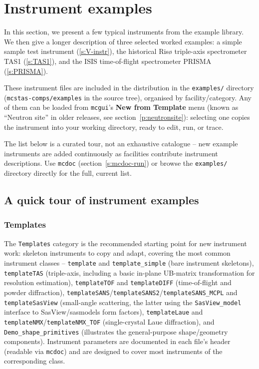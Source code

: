 
\chapter{Instrument examples}
\label{s:instrument}

In this section, we present a few typical instruments from the \MCS example
library.  We then give a longer description of three selected worked
examples: a simple sample test instrument (\ref{s:V-instr}), the historical
Risø triple-axis spectrometer TAS1 (\ref{s:TAS1}), and the ISIS
time-of-flight spectrometer PRISMA (\ref{s:PRISMA}).

These instrument files are included in the \MCS distribution in the
\verb+examples/+ directory (\verb+mcstas-comps/examples+ in the source
tree), organised by facility/category. Any of them can be loaded from
\texttt{mcgui}'s \textbf{New from Template} menu (known as ``Neutron site''
in older \MCS releases, see section~\ref{p:neutronsite}): selecting one
copies the instrument into your working directory, ready to edit, run, or
trace.

The list below is a curated tour, not an exhaustive catalogue -- new
example instruments are added continuously as facilities contribute
instrument descriptions. Use \verb+mcdoc+ (section~\ref{s:mcdoc-run}) or
browse the \verb+examples/+ directory directly for the full, current list.

\section{A quick tour of instrument examples}
\label{s:quick-tour-instr}

\subsection{Templates}

The \texttt{Templates} category is the recommended starting point for new
instrument work: skeleton instruments to copy and adapt, covering the most
common instrument classes -- \texttt{template} and \texttt{template\_simple}
(bare instrument skeletons), \texttt{templateTAS} (triple-axis, including a
basic in-plane UB-matrix transformation for resolution estimation),
\texttt{templateTOF} and \texttt{templateDIFF} (time-of-flight and powder
diffraction), \texttt{templateSANS}/\texttt{templateSANS2}/\texttt{templateSANS\_MCPL}
and \texttt{templateSasView} (small-angle scattering, the latter using the
\texttt{SasView\_model} interface to SasView/sasmodels form factors),
\texttt{templateLaue} and \texttt{templateNMX}/\texttt{templateNMX\_TOF}
(single-crystal Laue diffraction), and \texttt{Demo\_shape\_primitives}
(illustrates the general-purpose shape/geometry components). Instrument
parameters are documented in each file's header (readable via
\verb+mcdoc+) and are designed to cover most instruments of the
corresponding class.

